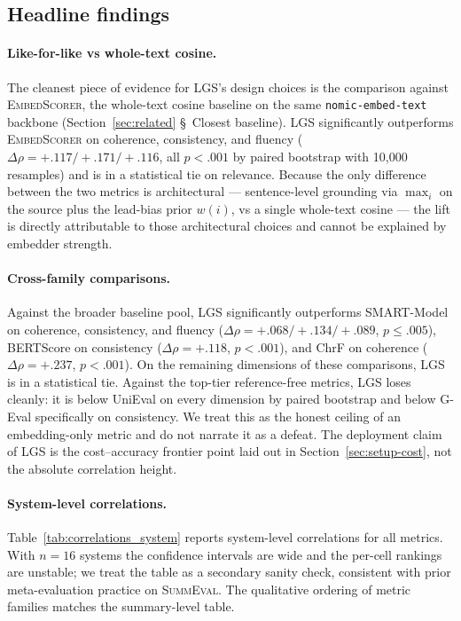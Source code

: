 \documentclass[journal]{IEEEtran}
\begin{document}




\subsection{Headline findings}
\paragraph{Like-for-like vs whole-text cosine.}
The cleanest piece of evidence for LGS's design choices is the
comparison against \textsc{EmbedScorer}, the whole-text cosine
baseline on the same \texttt{nomic-embed-text} backbone
(Section~\ref{sec:related} \S~Closest baseline). LGS
significantly outperforms \textsc{EmbedScorer} on coherence,
consistency, and fluency ($\Delta\rho{=}+.117 / +.171 / +.116$,
all $p<.001$ by paired bootstrap with 10{,}000 resamples) and is
in a statistical tie on relevance. Because the only difference
between the two metrics is architectural --- sentence-level
grounding via $\max_i$ on the source plus the lead-bias prior
$w(i)$, vs a single whole-text cosine --- the lift is directly
attributable to those architectural choices and cannot be
explained by embedder strength.

\paragraph{Cross-family comparisons.}
Against the broader baseline pool, LGS significantly outperforms
SMART-Model on coherence, consistency, and fluency
($\Delta\rho{=}+.068 / +.134 / +.089$, $p \le .005$),
BERTScore on consistency
($\Delta\rho{=}+.118$, $p<.001$), and ChrF on coherence
($\Delta\rho{=}+.237$, $p<.001$). On the remaining dimensions of
these comparisons, LGS is in a statistical tie. Against the
top-tier reference-free metrics, LGS loses cleanly: it is below
UniEval on every dimension by paired bootstrap and below G-Eval
specifically on consistency. We treat this as the honest ceiling
of an embedding-only metric and do not narrate it as a defeat.
The deployment claim of LGS is the cost--accuracy frontier point
laid out in Section~\ref{sec:setup-cost}, not the absolute
correlation height.

\paragraph{System-level correlations.}
Table~\ref{tab:correlations_system} reports system-level
correlations for all metrics. With $n{=}16$ systems the
confidence intervals are wide and the per-cell rankings are
unstable; we treat the table as a secondary sanity check,
consistent with prior meta-evaluation practice on
\textsc{SummEval}. The qualitative ordering of metric families
matches the summary-level table.
\end{document}
